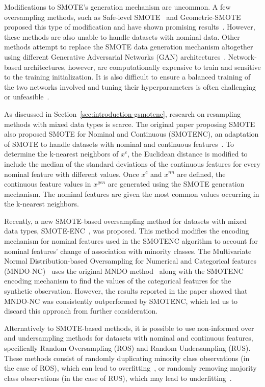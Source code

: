 Modifications to SMOTE's generation mechanism are uncommon. A few oversampling
methods, such as Safe-level SMOTE~\cite{bunkhumpornpat2009safe} and
Geometric-SMOTE~\cite{Douzas2019} proposed this type of modification
and have shown promising results~\cite{Douzas2019rs}. However, these
methods are also unable to handle datasets with nominal data. Other
methods attempt to replace the SMOTE data generation mechanism altogether
using different Generative Adversarial Networks (GAN)
architectures~\cite{salazar2021generative, koivu2020synthetic, jo2022obgan}.
Network-based architectures, however, are computationally expensive to train
and sensitive to the training initialization. It is also difficult to ensure a
balanced training of the two networks involved and tuning their
hyperparameters is often challenging or unfeasible~\cite{gonog2019review}. 

As discussed in Section~\ref{sec:introduction-gsmotenc}, research on resampling methods
with mixed data types is scarce. The original paper proposing SMOTE also
proposed SMOTE for Nominal and Continuous (SMOTENC), an adaptation of SMOTE to
handle datasets with nominal and continuous features~\cite{Chawla2002}. To
determine the k-nearest neighbors of $x^c$, the Euclidean distance is modified
to include the median of the standard
deviations of the continuous features for every nominal feature with
different values. Once $x^c$ and $x^{nn}$ are defined,  
the continuous feature values in $x^{gen}$ are generated using the SMOTE generation
mechanism. The nominal features are given the most common values
occurring in the k-nearest neighbors.

Recently, a new SMOTE-based oversampling method for
datasets with mixed data types, SMOTE-ENC~\cite{mukherjee2021smote}, was
proposed. This method modifies the encoding mechanism for nominal features
used in the SMOTENC algorithm to account for nominal features' change of
association with minority classes. The Multivariate Normal Distribution-based
Oversampling for Numerical and Categorical features
(MNDO-NC)~\cite{ambai2019multivariate} uses the original MNDO
method~\cite{ambai2018mndo} along with the SMOTENC encoding mechanism to find
the values of the categorical features for the synthetic observation. However,
the results reported in the paper showed that MNDO-NC was consistently
outperformed by SMOTENC, which led us to discard this approach from further
consideration.

Alternatively to SMOTE-based methods, it is possible to use non-informed over
and undersampling methods for datasets with nominal and continuous features,
specifically Random Oversampling (ROS) and Random Undersampling (RUS). These
methods consist of randomly duplicating minority class observations (in the
case of ROS), which can lead to overfitting~\cite{park2021combined,
batista2004study}, or randomly removing majority class observations (in the
case of RUS), which may lead to underfitting~\cite{bansal2021analysis}.


